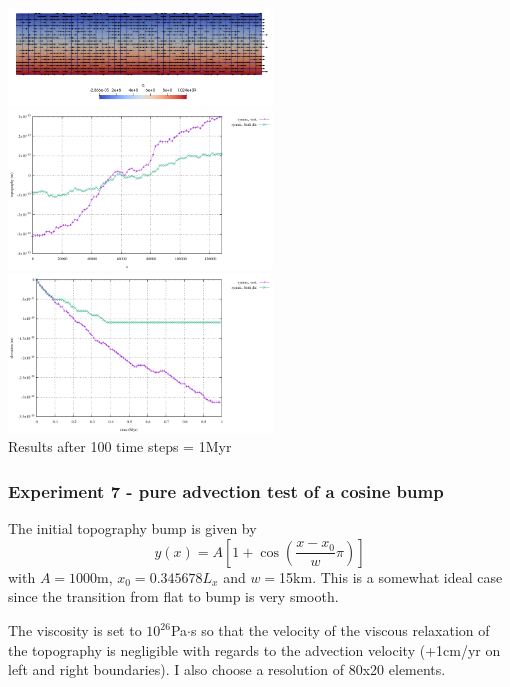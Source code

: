 \begin{center}
\includegraphics[width=7cm]{python_codes/fieldstone_54/images/exp6/velp}\\
\includegraphics[width=7cm]{python_codes/fieldstone_54/images/exp6/surface.pdf}
\includegraphics[width=7cm]{python_codes/fieldstone_54/images/exp6/elevation.pdf}\\
{\captionfont Results after 100 time steps = 1Myr}
\end{center}

\subsubsection*{Experiment 7 - pure advection test of a cosine bump}

The initial topography bump is given by
\[
y(x)=A \left[ 1+ \cos \left( \frac{x-x_0}{w} \pi \right) \right]
\]
with $A=1000$m, $x_0=0.345678L_x$ and $w=$15km. This is a somewhat ideal case 
since the transition from flat to bump is very smooth.

The viscosity is set to $10^{26}$Pa$\cdot$s so that the velocity of the 
viscous relaxation of the topography is negligible with regards to the advection velocity
(+1cm/yr on left and right boundaries). I also choose a resolution of 80x20 elements.

